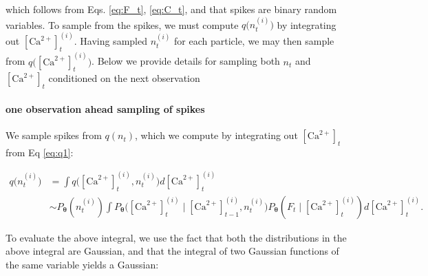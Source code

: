 \documentclass[12pt]{article}
\providecommand{\ve}[1]{\boldsymbol{#1}}
\providecommand{\ve}[1]{\boldsymbol{#1}}
\newcommand{\thetn}{\ve{\theta}}
\newcommand{\p}{P_{\thetn}}
\newcommand{\Ca}{[\text{Ca}^{2+}]}
\begin{document}
\noindent which follows from Eqs. \ref{eq:F_t}, \ref{eq:C_t}, and that spikes are binary random variables. %
To sample from the spikes, we must compute $q\big(n_t^{(i)})$ by integrating out $\Ca_t^{(i)}$.  Having sampled $n_t^{(i)}$ for each particle, we may then sample from $q\big(\Ca_t^{(i)}\big)$. Below we provide details for sampling both $n_t$ and $\Ca_t$ conditioned on the next observation

\paragraph{one observation ahead sampling of spikes}

We sample spikes from $q(n_t)$, which we compute by integrating out $\Ca_t$ from Eq \ref{eq:q1}:

\begin{subequations}
\begin{align}
q\big(n_t^{(i)}\big) &= \int q\big(\Ca_t^{(i)}, n_t^{(i)}) d\Ca_t^{(i)}
\\ &\sim \p(n_t^{(i)}) \int \p \big( \Ca_t^{(i)} \mid \Ca^{(i)}_{t-1}, n_t^{(i)} \big) \p(F_t \mid \Ca_t^{(i)}) d\Ca_t^{(i)}. \label{eq:q_n}
\end{align}
\end{subequations}



\noindent To evaluate the above integral, we use the fact that both the distributions in the above integral are Gaussian, and that the integral of two Gaussian functions of the same variable yields a Gaussian:
\end{document}
